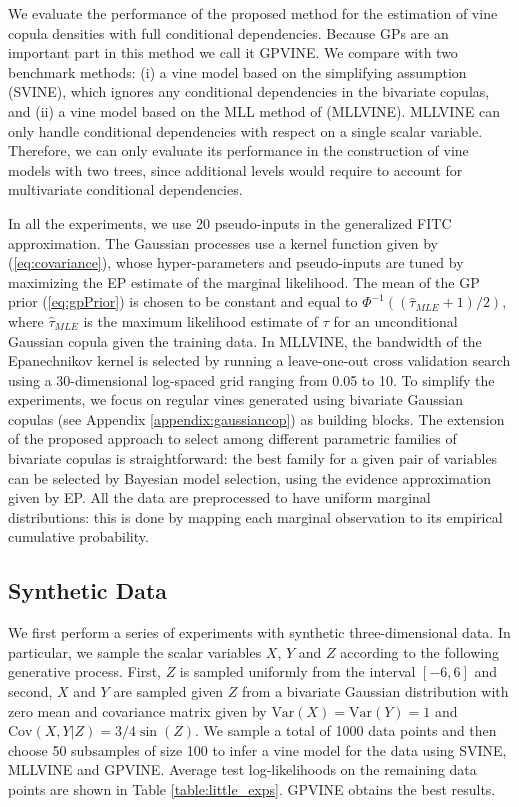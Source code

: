 \documentclass{article}
\begin{document}
We evaluate the performance of the proposed method for the
estimation of vine copula densities with full conditional dependencies.  Because GPs are
an important part in this method we call it GPVINE.  We compare with two
benchmark methods: (i) a vine model based on the simplifying assumption
(SVINE), which ignores any conditional dependencies in the bivariate copulas,
and (ii) a vine model based on the MLL method of \citet{Acar2012} (MLLVINE).
MLLVINE can only handle conditional dependencies with respect on a single
scalar variable.  Therefore, we can only evaluate its performance in the
construction of vine models with two trees, since additional levels would
require to account for multivariate conditional dependencies.

In all the experiments, we use 20 pseudo-inputs in the generalized FITC
approximation. The Gaussian processes use a kernel function given by
(\ref{eq:covariance}), whose hyper-parameters and pseudo-inputs are tuned by
maximizing the EP estimate of the marginal likelihood.  The mean of the GP
prior (\ref{eq:gpPrior}) is chosen to be constant and equal to
$\Phi^{-1}((\hat{\tau}_{MLE} + 1) / 2)$, where $\hat{\tau}_{MLE}$ is the
maximum likelihood estimate of $\tau$ for an unconditional Gaussian copula
given the training data.  In MLLVINE, the bandwidth of the Epanechnikov kernel
is selected by running a leave-one-out cross validation search using a
30-dimensional log-spaced grid ranging from 0.05 to 10.  To simplify the
experiments, we focus on regular vines generated using bivariate Gaussian
copulas (see Appendix \ref{appendix:gaussiancop}) as building blocks.  The
extension of the proposed approach to select among different parametric
families of bivariate copulas is straightforward: the best family for a given
pair of variables can be selected by Bayesian model selection, using the
evidence approximation given by EP.  All the data are preprocessed to have
uniform marginal distributions: this is done by mapping each marginal
observation to its empirical cumulative probability.

\subsection{Synthetic Data}\label{exp:syn}

We first perform a series of experiments with synthetic three-dimensional data.
In particular, we sample the scalar variables $X$, $Y$ and $Z$ according to the
following generative process.  First, $Z$ is sampled uniformly from the
interval $[-6,6]$ and second, $X$ and $Y$ are sampled given $Z$ from a
bivariate Gaussian distribution with zero mean and covariance matrix given by
$\text{Var}(X) = \text{Var}(Y) = 1$ and $\text{Cov}(X,Y|Z) = 3 / 4
\sin(Z)$.  We sample a total of 1000 data points and then choose 50 subsamples
of size 100 to infer a vine model for the data using SVINE, MLLVINE and GPVINE.
Average test log-likelihoods on the remaining data points are shown in Table
\ref{table:little_exps}. GPVINE obtains the best results.
\end{document}
